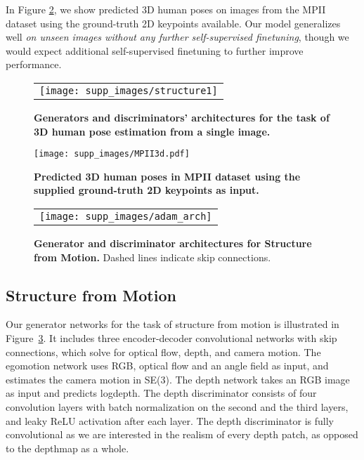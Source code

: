 \documentclass[10pt,twocolumn,letterpaper]{article}
\begin{document}
\begin{bibunit}[ieee]
\begin{appendices}
In Figure \ref{fig:mpii}, we show predicted 3D human poses on  images from the MPII dataset \cite{andriluka14cvpr} using the ground-truth 2D keypoints available. Our model generalizes well \textit{on unseen  images without any further self-supervised finetuning}, though we would expect  additional self-supervised finetuning to further improve performance. 
\begin{figure}[t]
    \begin{tabular}{l}
    \texttt{[image: supp\_images/structure1]} \\
    \end{tabular}
\centering
    \label{fig:architectures1}
    \caption{\textbf{Generators and discriminators' architectures for the task of 3D human pose estimation from a single image.}}
\end{figure}\begin{figure}[t]
    \centering
    \texttt{[image: supp\_images/MPII3d.pdf]}
     \centering
    \caption{\textbf{Predicted 3D human poses in MPII dataset using the supplied ground-truth 2D keypoints as input.} }
    \label{fig:mpii}
\end{figure}\begin{figure}[t]
    \begin{tabular}{l}
    \texttt{[image: supp\_images/adam\_arch]} \\
    \end{tabular}
\centering
    \label{fig:architectures2}
    \caption{\textbf{Generator and discriminator architectures for  Structure from Motion.} Dashed lines indicate skip connections. }
\end{figure}\subsection{Structure from Motion}
Our generator networks for the task of structure from motion is illustrated in Figure~\ref{fig:architectures2}. It includes three encoder-decoder convolutional networks with skip connections, which solve for optical flow, depth, and camera motion. The egomotion network uses RGB, optical flow and an angle field as input, and estimates the camera motion in SE(3). %
The depth network takes an RGB image as input and predicts logdepth. 
The depth discriminator consists of four convolution layers with batch normalization on the second and the third layers, and leaky ReLU activation after each layer. The depth  discriminator is fully convolutional as we are interested in the realism of every depth patch, as opposed to the depthmap as a whole. 


\end{appendices}
\end{bibunit}
\end{document}

